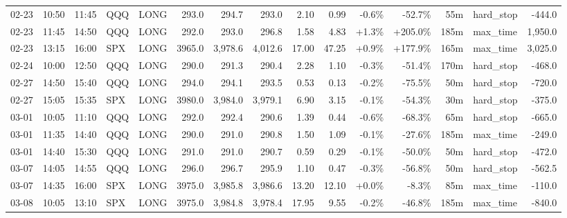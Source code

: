 \documentclass[11pt,a4paper,twoside]{article}
\begin{document}
\begin{landscape}
\begin{center}
\begin{longtable}{>{\color{txtmain}}l l l l l r r r r r r r r >{\color{txtmain}}l r}
02-23 & 10:50 & 11:45 & QQQ & LONG & 293.0 & 294.7 & 293.0 & 2.10 & 0.99 & \textcolor{lossred}{-0.6\%} & \textcolor{lossred}{-52.7\%} & 55m & hard\_stop & \textcolor{lossred}{-444.0} \\
02-23 & 11:45 & 14:50 & QQQ & LONG & 292.0 & 293.0 & 296.8 & 1.58 & 4.83 & \textcolor{wingreen}{+1.3\%} & \textcolor{wingreen}{+205.0\%} & 185m & max\_time & \textcolor{wingreen}{1,950.0} \\
02-23 & 13:15 & 16:00 & SPX & LONG & 3965.0 & 3,978.6 & 4,012.6 & 17.00 & 47.25 & \textcolor{wingreen}{+0.9\%} & \textcolor{wingreen}{+177.9\%} & 165m & max\_time & \textcolor{wingreen}{3,025.0} \\
02-24 & 10:00 & 12:50 & QQQ & LONG & 290.0 & 291.3 & 290.4 & 2.28 & 1.10 & \textcolor{lossred}{-0.3\%} & \textcolor{lossred}{-51.4\%} & 170m & hard\_stop & \textcolor{lossred}{-468.0} \\
02-27 & 14:50 & 15:40 & QQQ & LONG & 294.0 & 294.1 & 293.5 & 0.53 & 0.13 & \textcolor{lossred}{-0.2\%} & \textcolor{lossred}{-75.5\%} & 50m & hard\_stop & \textcolor{lossred}{-720.0} \\
02-27 & 15:05 & 15:35 & SPX & LONG & 3980.0 & 3,984.0 & 3,979.1 & 6.90 & 3.15 & \textcolor{lossred}{-0.1\%} & \textcolor{lossred}{-54.3\%} & 30m & hard\_stop & \textcolor{lossred}{-375.0} \\
03-01 & 10:05 & 11:10 & QQQ & LONG & 292.0 & 292.4 & 290.6 & 1.39 & 0.44 & \textcolor{lossred}{-0.6\%} & \textcolor{lossred}{-68.3\%} & 65m & hard\_stop & \textcolor{lossred}{-665.0} \\
03-01 & 11:35 & 14:40 & QQQ & LONG & 290.0 & 291.0 & 290.8 & 1.50 & 1.09 & \textcolor{lossred}{-0.1\%} & \textcolor{lossred}{-27.6\%} & 185m & max\_time & \textcolor{lossred}{-249.0} \\
03-01 & 14:40 & 15:30 & QQQ & LONG & 291.0 & 291.0 & 290.7 & 0.59 & 0.29 & \textcolor{lossred}{-0.1\%} & \textcolor{lossred}{-50.0\%} & 50m & hard\_stop & \textcolor{lossred}{-472.0} \\
03-07 & 14:05 & 14:55 & QQQ & LONG & 296.0 & 296.7 & 295.9 & 1.10 & 0.47 & \textcolor{lossred}{-0.3\%} & \textcolor{lossred}{-56.8\%} & 50m & hard\_stop & \textcolor{lossred}{-562.5} \\
03-07 & 14:35 & 16:00 & SPX & LONG & 3975.0 & 3,985.8 & 3,986.6 & 13.20 & 12.10 & \textcolor{wingreen}{+0.0\%} & \textcolor{lossred}{-8.3\%} & 85m & max\_time & \textcolor{lossred}{-110.0} \\
03-08 & 10:05 & 13:10 & SPX & LONG & 3975.0 & 3,984.8 & 3,978.4 & 17.95 & 9.55 & \textcolor{lossred}{-0.2\%} & \textcolor{lossred}{-46.8\%} & 185m & max\_time & \textcolor{lossred}{-840.0} \\

\end{longtable}
\end{center}
\end{landscape}
\end{document}

